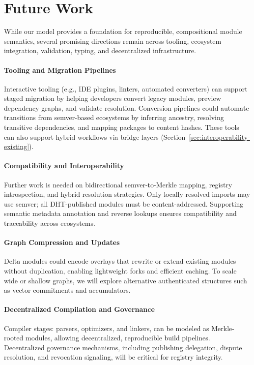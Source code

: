 \documentclass[sigplan,screen]{acmart}
\begin{document}
\section{Future Work}
\label{sec:future-work}

While our model provides a foundation for reproducible, compositional module semantics, several promising directions remain across tooling, ecosystem integration, validation, typing, and decentralized infrastructure.

\paragraph{Tooling and Migration Pipelines} Interactive tooling (e.g., IDE plugins, linters, automated converters) can support staged migration by helping developers convert legacy modules, preview dependency graphs, and validate resolution. Conversion pipelines could automate transitions from semver-based ecosystems by inferring ancestry, resolving transitive dependencies, and mapping packages to content hashes. These tools can also support hybrid workflows via bridge layers (Section~\ref{sec:interoperability-existing}).

\paragraph{Compatibility and Interoperability} Further work is needed on bidirectional semver-to-Merkle mapping, registry introspection, and hybrid resolution strategies. Only locally resolved imports may use semver; all DHT-published modules must be content-addressed. Supporting semantic metadata annotation and reverse lookups ensures compatibility and traceability across ecosystems.

\paragraph{Graph Compression and Updates} Delta modules could encode overlays that rewrite or extend existing modules without duplication, enabling lightweight forks and efficient caching. To scale wide or shallow graphs, we will explore alternative authenticated structures such as vector commitments and accumulators.

\paragraph{Decentralized Compilation and Governance} Compiler stages: parsers, optimizers, and linkers, can be modeled as Merkle-rooted modules, allowing decentralized, reproducible build pipelines. Decentralized governance mechanisms, including publishing delegation, dispute resolution, and revocation signaling, will be critical for registry integrity.
\end{document}
